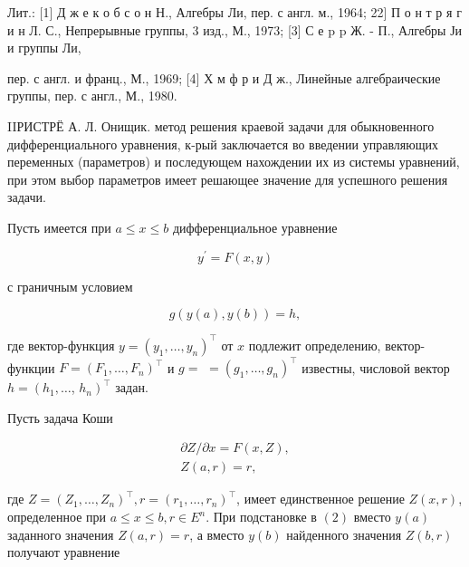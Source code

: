 \documentclass[10pt]{article}
\begin{document}
Лит.: [1] Д ж е к о б с о н Н., Алгебры Ли, пер. с англ. м., 1964; 22] П о н т р я г и н Л. С., Непрерывные группы, 3 изд., М., 1973; [3] С е p p Ж. - П., Алгебры Ји и группы Ли,

пер. с англ. и франц., М., 1969; [4] Х м ф р и Д ж., Линейные алгебраические группы, пер. с англ., М., 1980.



IIРИСТРЁ А. Л. Онищик. метод решения краевой задачи для обыкновенного дифференциального уравнения, к-рый заключается во введении управляющих переменных (параметров) и последующем нахождении их из системы уравнений, при этом выбор параметров имеет решающее значение для успешного решения задачи.



Пусть имеется при $a \leqslant x \leqslant b$ дифференциальное уравнение



\[

y^{\prime}=F(x, y)

\]



с граничным условием



\[

g(y(a), y(b))=h,

\]



где вектор-функция $y=\left(y_{1}, \ldots, y_{n}\right)^{\top}$ от $x$ подлежит определению, вектор-функции $F=\left(F_{1}, \ldots, F_{n}\right)^{\top}$ и $g=$ $=\left(g_{1}, \ldots, g_{n}\right)^{\top}$ известны, числовой вектор $h=\left(h_{1}, \ldots\right.$, $\left.h_{n}\right)^{\top}$ задан.



Пусть задача Коши



\[

\begin{gathered}

\partial Z / \partial x=F(x, Z), \\

Z(a, r)=r,

\end{gathered}

\]



где $Z=\left(Z_{1}, \ldots, Z_{n}\right)^{\top}, r=\left(r_{1}, \ldots, r_{n}\right)^{\top}$, имеет единственное решение $Z(x, r)$, определенное при $a \leqslant x \leqslant b, r \in E^{n}$. При подстановке в $(2)$ вместо $y(a)$ заданного значения $Z(a, r)=r$, а вместо $y(b)$ найденного значения $Z(b, r)$ получают уравнение
\end{document}
